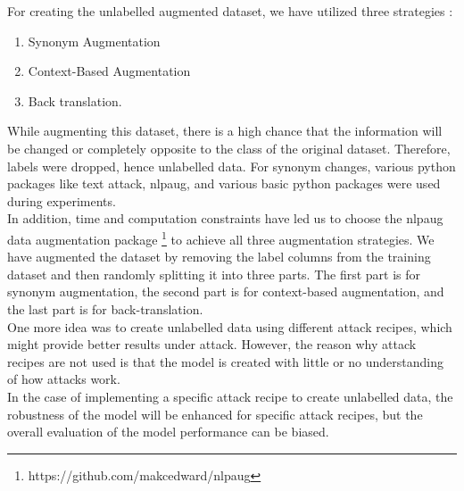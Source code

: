 \documentclass[%
	BCOR=8mm, %
	DIV=12,
	toc=bibliography, %
	toc=listof, %
	oneside, %
	egregdoesnotlikesansseriftitles, %
	]{scrbook}
\begin{document}
For creating the unlabelled augmented dataset, we have utilized three strategies :
\begin{enumerate}
\item  Synonym Augmentation
\item Context-Based Augmentation
\item Back translation.
\end{enumerate}
While augmenting this dataset, there is a high chance that the information will be changed or completely opposite to the class of the original dataset. Therefore, labels were dropped, hence unlabelled data. 
For synonym changes, various python packages like text attack, nlpaug, and various basic python packages were used during experiments.\\
In addition, time and computation constraints have led us to choose the nlpaug data augmentation package \footnote{https://github.com/makcedward/nlpaug} to achieve all three augmentation strategies. We have augmented the dataset by removing the label columns from the training dataset and then randomly splitting it into three parts. The first part is for synonym augmentation, the second part is for context-based augmentation, and the last part is for back-translation.\\
One more idea was to create unlabelled data using different attack recipes, which might provide better results under attack. However, the reason why attack recipes are not used is that the model is created with little or no understanding of how attacks work. \\
In the case of implementing a specific attack recipe to create unlabelled data,  the robustness of the model will be enhanced for specific attack recipes, but the overall evaluation of the model performance can be biased.
\end{document}
